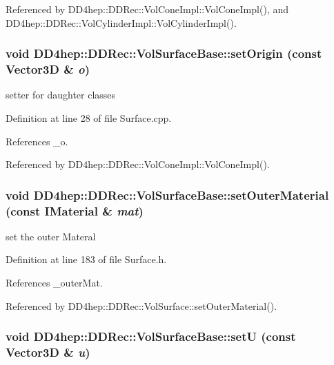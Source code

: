 Referenced by DD4hep::DDRec::VolConeImpl::VolConeImpl(), and DD4hep::DDRec::VolCylinderImpl::VolCylinderImpl().\hypertarget{class_d_d4hep_1_1_d_d_rec_1_1_vol_surface_base_a3dc33b9f3661403fbeeaeb787e71d247}{
\subsubsection[{setOrigin}]{\setlength{\rightskip}{0pt plus 5cm}void DD4hep::DDRec::VolSurfaceBase::setOrigin (const {\bf Vector3D} \& {\em o})}}
\label{class_d_d4hep_1_1_d_d_rec_1_1_vol_surface_base_a3dc33b9f3661403fbeeaeb787e71d247}


setter for daughter classes 

Definition at line 28 of file Surface.cpp.

References \_\-o.

Referenced by DD4hep::DDRec::VolConeImpl::VolConeImpl().\hypertarget{class_d_d4hep_1_1_d_d_rec_1_1_vol_surface_base_aa06c021dd2374985054c08648100b45a}{
\subsubsection[{setOuterMaterial}]{\setlength{\rightskip}{0pt plus 5cm}void DD4hep::DDRec::VolSurfaceBase::setOuterMaterial (const {\bf IMaterial} \& {\em mat})}}
\label{class_d_d4hep_1_1_d_d_rec_1_1_vol_surface_base_aa06c021dd2374985054c08648100b45a}


set the outer Materal 

Definition at line 183 of file Surface.h.

References \_\-outerMat.

Referenced by DD4hep::DDRec::VolSurface::setOuterMaterial().\hypertarget{class_d_d4hep_1_1_d_d_rec_1_1_vol_surface_base_a8a39b98345cf8bb2ea7912b3974552e9}{
\subsubsection[{setU}]{\setlength{\rightskip}{0pt plus 5cm}void DD4hep::DDRec::VolSurfaceBase::setU (const {\bf Vector3D} \& {\em u})}}
\label{class_d_d4hep_1_1_d_d_rec_1_1_vol_surface_base_a8a39b98345cf8bb2ea7912b3974552e9}


